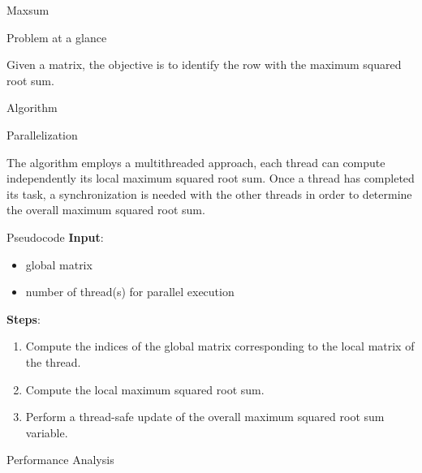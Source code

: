 \begin{chapter}{Maxsum}
    \begin{section}{Problem at a glance}
        \par Given a matrix, the objective is to identify the row with the maximum squared root sum.
    \end{section}
    \begin{section}{Algorithm}
        \begin{subsection}{Parallelization}
            \par The algorithm employs a multithreaded approach, each thread can compute independently its local maximum squared root sum. Once a thread has completed its task, a synchronization is needed with the other threads in order to determine the overall maximum squared root sum.
        \end{subsection}
        \begin{subsection}{Pseudocode}
            \textbf{Input}:
            \begin{itemize}
                \item global matrix
                \item number of thread(s) for parallel execution
            \end{itemize}
            \textbf{Steps}:
            \begin{enumerate}
                \item Compute the indices of the global matrix corresponding to the local matrix of the thread.
                \item Compute the local maximum squared root sum.
                \item Perform a thread-safe update of the overall maximum squared root sum variable.
            \end{enumerate}
            
        \end{subsection}
        \clearpage
        \begin{subsection}{Performance Analysis}
            \begin{figure}[ht]
                \centering
                
                \label{fig:maxsum-exectime}
            \end{figure}
            \begin{figure}[ht]
                \centering
                
                \label{fig:maxsum-speedup}
            \end{figure}
            \begin{figure}[ht]
                \centering
                
                \label{fig:maxsum-efficiency}
            \end{figure}
        \end{subsection}
    \end{section}
\end{chapter}